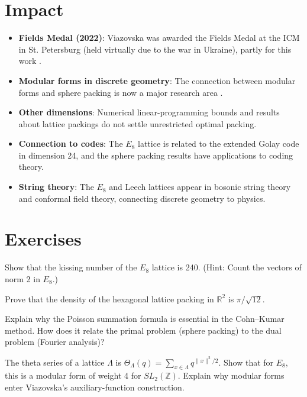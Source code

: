 \section{Impact}

\begin{itemize}
\item \textbf{Fields Medal (2022)}: Viazovska was awarded the Fields Medal at the ICM in St. Petersburg (held virtually due to the war in Ukraine), partly for this work \cite{fields2022}.
\item \textbf{Modular forms in discrete geometry}: The connection between modular forms and sphere packing is now a major research area \cite{viazovska2017, cohn2017}.
\item \textbf{Other dimensions}: Numerical linear-programming bounds and results about lattice packings do not settle unrestricted optimal packing.
\item \textbf{Connection to codes}: The $E_8$ lattice is related to the extended Golay code in dimension 24, and the sphere packing results have applications to coding theory.
\item \textbf{String theory}: The $E_8$ and Leech lattices appear in bosonic string theory and conformal field theory, connecting discrete geometry to physics.
\end{itemize}

\section{Exercises}

\begin{exercise}[Basic]
Show that the kissing number of the $E_8$ lattice is 240. (Hint: Count the vectors of norm 2 in $E_8$.) \cite{conway1999}
\end{exercise}

\begin{exercise}[Intermediate]
Prove that the density of the hexagonal lattice packing in $\mathbb{R}^2$ is $\pi/\sqrt{12}$. \cite{thue1910}
\end{exercise}

\begin{exercise}[Challenge]
Explain why the Poisson summation formula is essential in the Cohn--Kumar method. How does it relate the primal problem (sphere packing) to the dual problem (Fourier analysis)? \cite{cohn2003}
\end{exercise}

\begin{exercise}
The theta series of a lattice $\Lambda$ is $\Theta_\Lambda(q) = \sum_{x \in \Lambda} q^{\|x\|^2/2}$. Show that for $E_8$, this is a modular form of weight 4 for $SL_2(\mathbb Z)$. Explain why modular forms enter Viazovska's auxiliary-function construction. \cite{viazovska2017}
\end{exercise}


